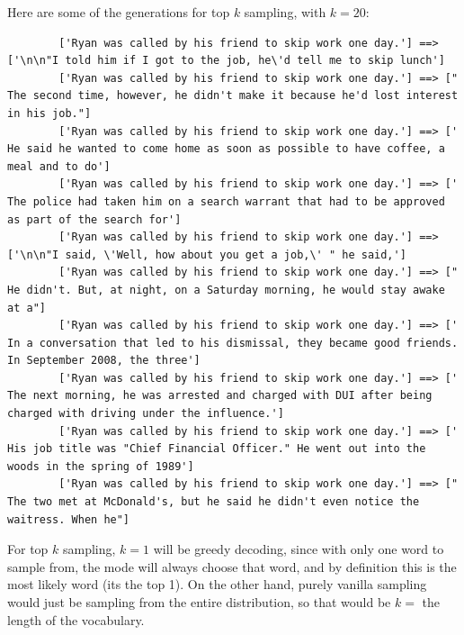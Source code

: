 \documentclass[12pt]{article}
\theoremstyle{definitionstyle}
\begin{document}
    Here are some of the generations for top $k$ sampling, with $k = 20$:
    \begin{lstlisting}
        ['Ryan was called by his friend to skip work one day.'] ==> ['\n\n"I told him if I got to the job, he\'d tell me to skip lunch']
        ['Ryan was called by his friend to skip work one day.'] ==> [" The second time, however, he didn't make it because he'd lost interest in his job."]
        ['Ryan was called by his friend to skip work one day.'] ==> [' He said he wanted to come home as soon as possible to have coffee, a meal and to do']
        ['Ryan was called by his friend to skip work one day.'] ==> [' The police had taken him on a search warrant that had to be approved as part of the search for']
        ['Ryan was called by his friend to skip work one day.'] ==> ['\n\n"I said, \'Well, how about you get a job,\' " he said,']
        ['Ryan was called by his friend to skip work one day.'] ==> [" He didn't. But, at night, on a Saturday morning, he would stay awake at a"]
        ['Ryan was called by his friend to skip work one day.'] ==> [' In a conversation that led to his dismissal, they became good friends. In September 2008, the three']
        ['Ryan was called by his friend to skip work one day.'] ==> [' The next morning, he was arrested and charged with DUI after being charged with driving under the influence.']
        ['Ryan was called by his friend to skip work one day.'] ==> [' His job title was "Chief Financial Officer." He went out into the woods in the spring of 1989']
        ['Ryan was called by his friend to skip work one day.'] ==> [" The two met at McDonald's, but he said he didn't even notice the waitress. When he"]
    \end{lstlisting}
    For top $k$ sampling, $k = 1$ will be greedy decoding, since with only one word to sample from, the mode will always choose that word, and by definition this is the most likely word (its the top 1). On the other hand, purely vanilla sampling would just be sampling from the entire distribution, so that would be $k = $ the length of the vocabulary. 
\end{document}
